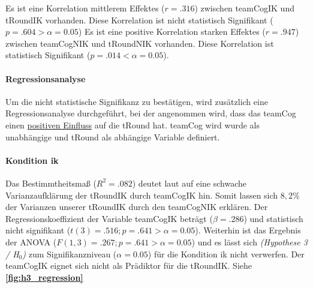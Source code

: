 \documentclass[a4paper,11pt]{article}%
\renewcommand{\\}{\vspace*{0.5\baselineskip} \newline}
\begin{document}
Es ist eine Korrelation mittlerem Effektes ($r = .316$) zwischen \ac{teamCogIK} und \ac{tRoundIK} vorhanden. Diese Korrelation ist nicht statistisch Signifikant ($p = .604 > \alpha = 0.05$)
Es ist eine positive Korrelation starken Effektes ($r = .947$) zwischen \ac{teamCogNIK} und \ac{tRoundNIK} vorhanden. Diese Korrelation ist statistisch Signifikant ($p = .014 < \alpha = 0.05$). 

\paragraph{Regressionsanalyse}
Um die nicht statistische Signifikanz zu bestätigen, wird zusätzlich eine Regressionsanalyse durchgeführt, bei der angenommen wird, dass das \ac{teamCog} einen \underline{positiven Einfluss} auf die \ac{tRound} hat.
\ac{teamCog} wird wurde als unabhängige und \ac{tRound} als abhängige Variable definiert.

\paragraph{Kondition \ac{ik}}
Das Bestimmtheitsmaß ($R^{2} = .082$) deutet laut \citep{cohen2013statistical} auf eine schwache Varianzaufklärung der \ac{tRoundIK} durch \ac{teamCogIK} hin. Somit lassen sich $8,2\%$ der Varianzen unserer \ac{tRoundIK} durch den \ac{teamCogNIK} erklären. \\
Der Regressionskoeffizient der Variable \ac{teamCogIK} beträgt ($\beta = .286$) und statistisch nicht signifikant ($t(3) = .516; p = .641 > \alpha = 0.05$). \\
Weiterhin ist das Ergebnis der ANOVA ($F(1,3) = .267; p = .641 > \alpha = 0.05$) und es lässt sich \textit{(Hypothese 3 / H$_{0}$)} zum Signifikanzniveau ($\alpha = 0.05$) für die Kondition \ac{ik} nicht verwerfen. \\
Der \ac{teamCogIK} eignet sich nicht als Prädiktor für die \ac{tRoundIK}.
Siehe \textbf{\autoref{fig:h3_regression}}
\end{document}
